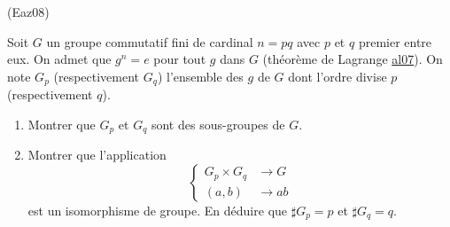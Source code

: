 \begin{tiny}(Eaz08)\end{tiny} Soit $G$ un groupe commutatif fini de cardinal $n=pq$ avec $p$ et $q$ premier entre eux. On admet que $g^n=e$ pour tout $g$ dans $G$ (théorème de Lagrange \href{http://back.maquisdoc.net/data/temptex/fexal.pdf}{al07}). On note $G_p$ (respectivement   $G_q$) l'ensemble des $g$ de $G$ dont l'ordre divise $p$ (respectivement $q$).
\begin{enumerate}
 \item Montrer que $G_p$ et $G_q$ sont des sous-groupes de $G$.
 \item Montrer que l'application
\begin{displaymath}
 \left\lbrace
\begin{aligned}
 G_p\times G_q 	&\rightarrow G\\
 (a,b) &\rightarrow ab
\end{aligned}
 \right. 
\end{displaymath}
est un isomorphisme de groupe. En déduire que $\sharp G_p=p$ et $\sharp G_q = q$. 
\end{enumerate}
 